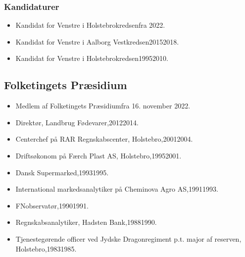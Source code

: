 \documentclass[11pt, a4paper]{awesome-cv}
\begin{document}
\begin{cvletter}
\subsubsection*{Kandidaturer}
\begin{itemize}
\item Kandidat for Venstre i Holstebrokredsenfra 2022.
\item Kandidat for Venstre i Aalborg Vestkredsen20152018.
\item Kandidat for Venstre i Holstebrokredsen19952010.
\end{itemize}
\subsection*{Folketingets Præsidium}
\begin{itemize}
\item Medlem af Folketingets Præsidiumfra 16. november 2022.
\end{itemize}
\begin{itemize}
\item Direktør, Landbrug  Fødevarer,20122014.
\item Centerchef på RAR Regnskabscenter, Holstebro,20012004.
\item Driftsøkonom på Færch Plast AS, Holstebro,19952001.
\item Dansk Supermarked,19931995.
\item International markedsanalytiker på Cheminova Agro AS,19911993.
\item FNobservatør,19901991.
\item Regnskabsanalytiker, Hadsten Bank,19881990.
\item Tjenestegørende officer ved Jydske Dragonregiment p.t. major af reserven, Holstebro,19831985.
\end{itemize}
\end{cvletter}
\end{document}
